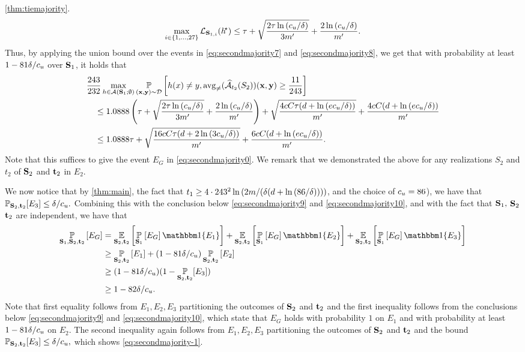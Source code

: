 \begin{proofof}{\cref{thm:tiemajority}.}
\begin{align}\label{eq:secondmajority8}
    \max_{i\in\{  1,\ldots,27\} }\operatorname{\mathcal{L}}_{\mathbf{S}_{1,i}}(h^{\negmedspace\star})\leq \tau+\sqrt{\frac{2\tau \ln{(c_{u}/\delta )}}{3m'}}+\frac{2\ln{(c_{u}/\delta )}}{m'}.
\end{align}
Thus, by applying the union bound over the events in \cref{eq:secondmajority7} and \cref{eq:secondmajority8}, we get that with probability at least $ 1-81\delta/c_{u} $ over $ \mathbf{S}_{1} $, it holds that
\begin{align}\label{eq:secondmajority10}
& \frac{243}{232}\max_{h\in \mathcal{A}(\mathbf{S}_{1};\emptyset)}\operatorname*{\mathbb{P}}_{(\mathbf{x},\mathbf{y})\sim \mathcal{D}}\left[h(x)\not=y,\operatorname{\mathrm{avg}_{\not=}}(\widehat{\mathcal{A}}_{t_{2}}(S_{2}))(\mathbf{x},\mathbf{y})\geq \frac{11}{243}\right] \nonumber
    \\
& \quad \leq 1.0888\left(\tau+\sqrt{\frac{2\tau \ln{(c_{u}/\delta )}}{3m'}}+\frac{2\ln{(c_{u}/\delta )}}{m'}\right)+\sqrt{\frac{4cC\tau(d+\ln{\left(ec_{u}/\delta \right)})}{m'}}+\frac{4cC(d+\ln{\left(ec_{u}/\delta \right)})}{m'} \nonumber 
    \\
& \quad \leq  1.0888\tau+\sqrt{\frac{16cC\tau(d+2\ln{\left(3c_{u}/\delta \right)})}{m'}}+\frac{6cC(d+\ln{\left(ec_{u}/\delta \right)})}{m'}.
\end{align}
Note that this suffices to give the event $ E_{G} $ in \cref{eq:secondmajority0}.
We remark that we demonstrated the above for any realizations $ S_{2} $ and $ t_{2} $ of $ \mathbf{S}_{2} $ and $ \mathbf{t}_{2}$ in $ E_{2}.$

We now notice that by \cref{thm:main}, the fact that $ t_{1}\geq 4\cdot243^{2}\ln{\left(2m/(\delta(d+\ln{\left(86/\delta \right)})) \right)}$, and the choice of $ c_{u}=86 $), we have that $ \operatorname*{\mathbb{P}}_{\mathbf{S}_{2},\mathbf{t}_{2}}[E_{3}]\leq \delta/c_{u}.$ 
Combining this with the conclusion below \cref{eq:secondmajority9} and \cref{eq:secondmajority10}, and with the fact that $ \mathbf{S}_{1},$  $ \mathbf{S}_{2} $ $ \mathbf{t}_{2} $ are independent, we have that 
\begin{align*}
 \p_{\rS_{1},\rS_{2},\rt_{2}}\left[E_{G}\right]
& =\e_{\rS_{2},\rt_{2}}\left[\p_{\rS_{1}}\left[E_{G}\right]\ind\{   E_{1}\}\right]+\e_{\rS_{2},\rt_{2}}\left[\p_{\rS_{1}}\left[E_{G}\right]\ind\{   E_{2}\}\right]+\e_{\rS_{2},\rt_{2}}\left[\p_{\rS_{1}}\left[E_{G}\right]\ind\{   E_{3}\}\right]
 \\
 & \geq  \p_{\rS_{2},\rt_{2}}\left[ E_{1}\right]+(1-81\delta/\cu)\p_{\rS_{2},\rt_{2}}\left[ E_{2}\right] \\
 &\geq(1-81\delta/\cu)(1-\p_{\rS_{2},\rt_{2}}[E_{3}]) \\
 & \geq1-82\delta/\cu.
\end{align*}
Note that first equality follows from $ E_{1},E_{2},E_{3} $ partitioning the outcomes of $ \mathbf{S}_{2} $ and $ \mathbf{t}_{2}$ and the first inequality follows from the conclusions below \cref{eq:secondmajority9} and \cref{eq:secondmajority10}, which state that $ E_{G} $ holds with probability $ 1 $ on $ E_{1} $ and with probability at least $ 1-81\delta/c_{u}$ on $ E_{2} $. The second inequality again follows from $ E_{1},E_{2},E_{3} $ partitioning the outcomes of $ \mathbf{S}_{2} $ and $ \mathbf{t}_{2}$ and the bound $ \operatorname*{\mathbb{P}}_{\mathbf{S}_{2},\mathbf{t}_{2}}[E_{3}]\leq \delta/c_{u},$ which shows \cref{eq:secondmajority-1}.


\end{proofof}
